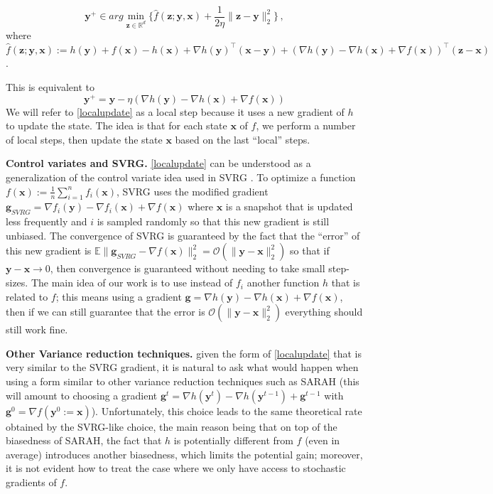 \documentclass[10pt]{article} %
\theoremstyle{plain}
\theoremstyle{definition}
\theoremstyle{remark}
\newcommand{\norm}[1]{\|#1\|_2}
\def\vg{{\bm{g}}}
\def\vx{{\bm{x}}}
\def\vy{{\bm{y}}}
\def\vz{{\bm{z}}}
\newcommand{\E}{\mathbb{E}}
\newcommand{\R}{\mathbb{R}}
\begin{document}
$$\vy^+ \in arg\min_{\vz\in\R^d }\{\hat{f}(\vz;\vy,\vx) + \frac{1}{2\eta}\norm{\vz-\vy}^2\}\,,$$
where $\hat{f}(\vz;\vy,\vx) := h(\vy) + f(\vx) - h(\vx) + \nabla h(\vy)^\top(\vx - \vy) + (\nabla h(\vy) - \nabla h(\vx) + \nabla f(\vx))^\top (\vz - \vx)$.

This is equivalent to 
\begin{equation}\label{localupdate}
    \vy^+ = \vy - \eta (\nabla h(\vy) - \nabla h(\vx) + \nabla f(\vx))
\end{equation}
We will refer to \eqref{localupdate} as a local step because it uses a new gradient of $h$ to update the state. The idea is that for each state $\vx$ of $f$, we perform a number of local steps, then update the state $\vx$ based on the last ``local'' steps.

\textbf{Control variates and SVRG.} \eqref{localupdate} can be understood as a generalization of the control variate idea used in SVRG \citep{SVRG}. To optimize a function $f(\vx):= \frac{1}{n}\sum_{i=1}^n f_i(\vx)$, SVRG uses the modified gradient $\vg_{SVRG} = \nabla f_i(\vy) - \nabla f_i(\vx) + \nabla f(\vx)$ where $\vx$ is a snapshot that is updated less frequently and $i$ is sampled randomly so that this new gradient is still unbiased. The convergence of SVRG is guaranteed by the fact that the ``error'' of this new gradient is  $\E\norm{\vg_{SVRG} -\nabla f(\vx) }^2=\mathcal{O}(\norm{\vy-\vx}^2)$ so that if $\vy-\vx\rightarrow 0$, then convergence is guaranteed without needing to take small step-sizes. The main idea of our work is to use instead of $f_i$ another function $h$ that is related to $f$; this means using a gradient $\vg = \nabla h(\vy) - \nabla h(\vx) + \nabla f(\vx)$, then if we can still guarantee that the error is $\mathcal{O}(\norm{\vy-\vx}^2)$  everything should still work fine.

\textbf{Other Variance reduction techniques.} given the form of \eqref{localupdate} that is very similar to the SVRG gradient, it is natural to ask what would happen when using a form similar to other variance reduction techniques such as SARAH \citep{nguyen2017sarah} (this will amount to choosing a gradient $\vg^t = \nabla h(\vy^t) - \nabla h(\vy^{t-1}) + \vg^{t-1}$ with $\vg^0 = \nabla f(\vy^0:=\vx)$). Unfortunately, this choice leads to the same theoretical rate obtained by the SVRG-like choice, the main reason being that on top of the biasedness of SARAH, the fact that $h$ is potentially different from $f$ (even in average) introduces another biasedness, which limits the potential gain; moreover, it is not evident how to treat the case where we only have access to stochastic gradients of $f$.
\end{document}
